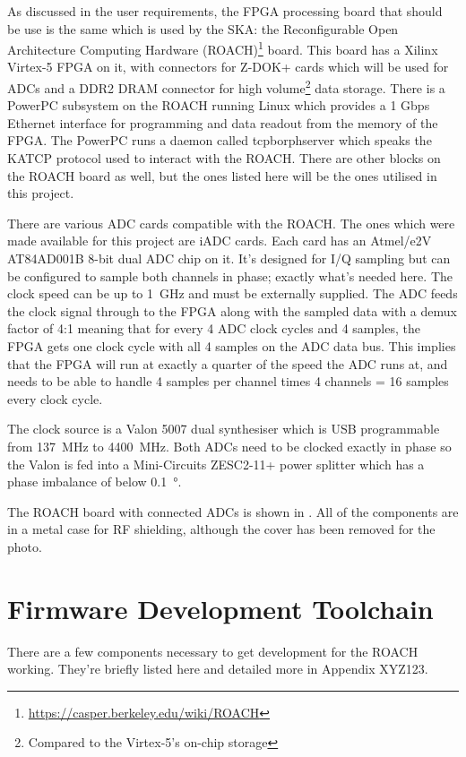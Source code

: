 As discussed in the user requirements, the FPGA processing board that should be use is the same which is used by the SKA: the Reconfigurable Open Architecture Computing Hardware (ROACH)\footnote{\url{https://casper.berkeley.edu/wiki/ROACH}} board. This board has a Xilinx Virtex-5 FPGA on it, with connectors for Z-DOK+ cards which will be used for ADCs and a DDR2 DRAM connector for high volume\footnote{Compared to the Virtex-5's on-chip storage} data storage. There is a PowerPC subsystem on the ROACH running Linux which provides a 1 Gbps Ethernet interface for programming and data readout from the memory of the FPGA. The PowerPC runs a daemon called tcpborphserver which speaks the KATCP protocol used to interact with the ROACH. There are other blocks on the ROACH board as well, but the ones listed here will be the ones utilised in this project.

There are various ADC cards compatible with the ROACH. The ones which were made available for this project are iADC cards. Each card has an Atmel/e2V AT84AD001B 8-bit dual ADC chip on it. It's designed for I/Q sampling but can be configured to sample both channels in phase; exactly what's needed here. The clock speed can be up to \SI{1}{\giga\hertz} and must be externally supplied. The ADC feeds the clock signal through to the FPGA along with the sampled data with a demux factor of 4:1 meaning that for every 4 ADC clock cycles and 4 samples, the FPGA gets one clock cycle with all 4 samples on the ADC data bus. This implies that the FPGA will run at exactly a quarter of the speed the ADC runs at, and needs to be able to handle 4 samples per channel times 4 channels = 16 samples every clock cycle.

The clock source is a Valon 5007 dual synthesiser which is USB programmable from \SI{137}{\mega\hertz} to \SI{4400}{\mega\hertz}. Both ADCs need to be clocked exactly in phase so the Valon is fed into a Mini-Circuits ZESC2-11+ power splitter which has a phase imbalance of below \SI{0.1}{\degree}.

The ROACH board with connected ADCs is shown in . All of the components are in a metal case for RF shielding, although the cover has been removed for the photo.


\section{Firmware Development Toolchain}
There are a few components necessary to get development for the ROACH working. They're briefly listed here and detailed more in Appendix XYZ123.\\

